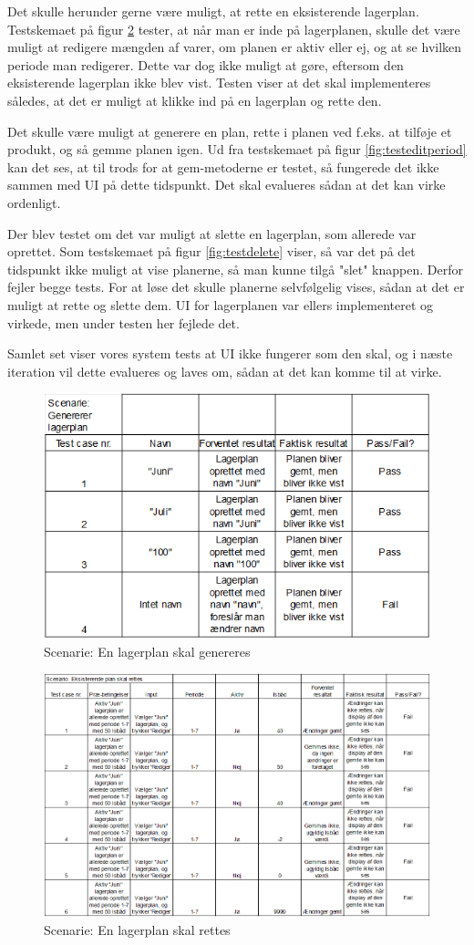 Det skulle herunder gerne være muligt, at rette en eksisterende lagerplan. Testskemaet på figur \ref{fig:testedit} tester, at når man er inde på lagerplanen, skulle det være muligt at redigere mængden af varer, om planen er aktiv eller ej, og at se hvilken periode man redigerer. Dette var dog ikke muligt at gøre, eftersom den eksisterende lagerplan ikke blev vist. Testen viser at det skal implementeres således, at det er muligt at klikke ind på en lagerplan og rette den. 

Det skulle være muligt at generere en plan, rette i planen ved f.eks. at tilføje et produkt, og så gemme planen igen. Ud fra testskemaet på figur \ref{fig:testeditperiod} kan det ses, at til trods for at gem-metoderne er testet, så fungerede det ikke sammen med UI på dette tidspunkt. Det skal evalueres sådan at det kan virke ordenligt.

Der blev testet om det var muligt at slette en lagerplan, som allerede var oprettet. Som testskemaet på figur \ref{fig:testdelete} viser, så var det på det tidspunkt ikke muligt at vise planerne, så man kunne tilgå "slet" knappen. Derfor fejler begge tests. For at løse det skulle planerne selvfølgelig vises, sådan at det er muligt at rette og slette dem. UI for lagerplanen var ellers implementeret og virkede, men under testen her fejlede det.

Samlet set viser vores system tests at UI ikke fungerer som den skal, og i næste iteration vil dette evalueres og laves om, sådan at det kan komme til at virke.

\begin{figure}[p]
    \centering
    \includegraphics[width=0.7\hsize]{figures/tests/test_generer_plan.png}
    \caption{Scenarie: En lagerplan skal genereres}
    \label{fig:testgenerate}
\end{figure}

\begin{figure}[p]
    \centering
    \includegraphics[width=0.7\hsize]{figures/tests/edit_existing_plan.png}
    \caption{Scenarie: En lagerplan skal rettes}
    \label{fig:testedit}
\end{figure}

